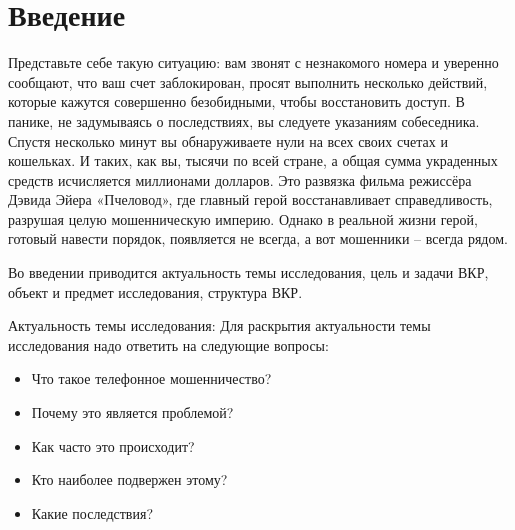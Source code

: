 \section*{\centering Введение}

Представьте себе такую ситуацию: вам звонят с незнакомого номера и уверенно сообщают, что ваш счет заблокирован, просят выполнить несколько действий, которые кажутся совершенно безобидными, чтобы восстановить доступ. В панике, не задумываясь о последствиях, вы следуете указаниям собеседника. Спустя несколько минут вы обнаруживаете нули на всех своих счетах и кошельках. И таких, как вы, тысячи по всей стране, а общая сумма украденных средств исчисляется миллионами долларов. Это развязка фильма режиссёра Дэвида Эйера «Пчеловод», где главный герой восстанавливает справедливость, разрушая целую мошенническую империю. Однако в реальной жизни герой, готовый навести порядок, появляется не всегда, а вот мошенники – всегда рядом.

Во введении приводится актуальность темы исследования, цель и задачи ВКР, объект и предмет исследования, структура ВКР.

Актуальность темы исследования:
Для раскрытия актуальности темы исследования надо ответить на следующие вопросы:
\begin{itemize}
	\item Что такое телефонное мошенничество?
	\item Почему это является проблемой?
	\item Как часто это происходит?
	\item Кто наиболее подвержен этому?
	\item Какие последствия?
\end{itemize}

\newpage
